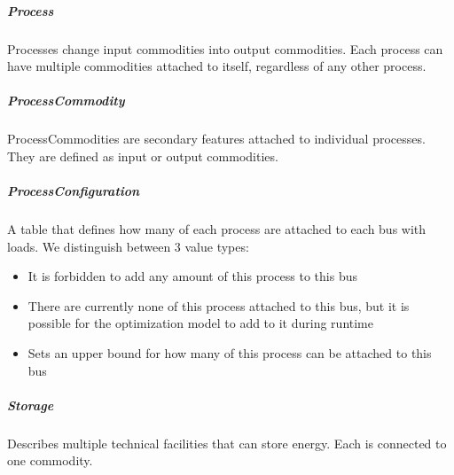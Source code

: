 \documentclass[letterpaper,10pt,english]{sphinxmanual}
\begin{document}
\subparagraph{Process}
\label{\detokenize{docs_gui/usage/urbs_setup:process}}
\begin{DUlineblock}{0em}
\item[] Processes change input commodities into output commodities. Each process can have multiple commodities attached to itself, regardless of any other process.
\end{DUlineblock}


\subparagraph{Process\sphinxhyphen{}Commodity}
\label{\detokenize{docs_gui/usage/urbs_setup:process-commodity}}
\begin{DUlineblock}{0em}
\item[] Process\sphinxhyphen{}Commodities are secondary features attached to individual processes. They are defined as input or output commodities.
\end{DUlineblock}


\subparagraph{Process\sphinxhyphen{}Configuration}
\label{\detokenize{docs_gui/usage/urbs_setup:process-configuration}}
\begin{DUlineblock}{0em}
\item[] A table that defines how many of each process are attached to each bus with loads. We distinguish between 3 value types:
\end{DUlineblock}
\begin{itemize}
\item {} 
\sphinxAtStartPar
{} It is forbidden to add any amount of this process to this bus

\item {} 
\sphinxAtStartPar
{} There are currently none of this process attached to this bus, but it is possible for the optimization model to add to it during runtime

\item {} 
\sphinxAtStartPar
{} Sets an upper bound for how many of this process can be attached to this bus

\end{itemize}


\subparagraph{Storage}
\label{\detokenize{docs_gui/usage/urbs_setup:storage}}
\begin{DUlineblock}{0em}
\item[] Describes multiple technical facilities that can store energy. Each is connected to one commodity.
\end{DUlineblock}
\end{document}
